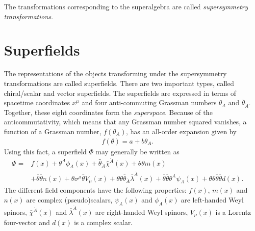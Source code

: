 The transformations corresponding to the superalgebra are called {\it supersymmetry transformations}.

\section{Superfields}
The representations of the objects transforming under the supersymmetry transformations are called superfields. There are two important types, called chiral/scalar and vector superfields. The superfields are expressed in terms of spacetime coordinates $x^\mu$ and four anti-commuting Grassman numbers $\theta_A$ and $\bar\theta_{\dot A}$. Together, these eight coordinates form the {\it superspace}. Because of the anticommutativity, which means that any Grassman number squared vanishes, a function of a Grassman number, $f(\theta_A)$, has an all-order expansion given by
\begin{align}
	f(\theta) = a + b\theta_A.
\end{align}
Using this fact, a superfield $\Phi$ may generally be written as
\begin{align}
	\Phi = &f(x) + \theta^A\phi_A(x) + \bar\theta_{\dot A}\bar\chi^{\dot A}(x) + \theta \theta m(x)\\
	 &+ \bar\theta \bar\theta n(x) + \theta\sigma^\mu \bar\theta V_\mu(x) + \theta\theta\bar\theta_{\dot A}\bar\lambda^{\dot A}(x) + \bar\theta \bar\theta \theta^A \psi_A(x) + \theta \theta \bar\theta \bar\theta d(x).\nonumber
\end{align}
The different field components have the following properties: $f(x)$, $m(x)$ and $n(x)$ are complex (pseudo)scalars, $\psi_A(x)$ and $\phi_A(x)$ are left-handed Weyl spinors, $\bar\chi^{\dot A}(x)$ and $\bar\lambda^{\dot A}(x)$ are right-handed Weyl spinors, $V_\mu (x)$ is a Lorentz four-vector and $d(x)$ is a complex scalar.

